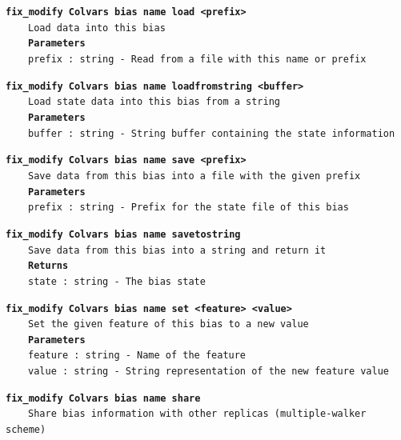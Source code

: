 \begin{mdexampleinput}{}
\texttt{\textbf{fix\_modify Colvars bias name load <prefix>}}
\\
\-~~~~\texttt{Load data into this bias}
\\
\-~~~~\texttt{\textbf{Parameters}}
\\
\-~~~~\texttt{prefix : string - Read from a file with this name or prefix}
\end{mdexampleinput}
\begin{mdexampleinput}{}
\texttt{\textbf{fix\_modify Colvars bias name loadfromstring <buffer>}}
\\
\-~~~~\texttt{Load state data into this bias from a string}
\\
\-~~~~\texttt{\textbf{Parameters}}
\\
\-~~~~\texttt{buffer : string - String buffer containing the state information}
\end{mdexampleinput}
\begin{mdexampleinput}{}
\texttt{\textbf{fix\_modify Colvars bias name save <prefix>}}
\\
\-~~~~\texttt{Save data from this bias into a file with the given prefix}
\\
\-~~~~\texttt{\textbf{Parameters}}
\\
\-~~~~\texttt{prefix : string - Prefix for the state file of this bias}
\end{mdexampleinput}
\begin{mdexampleinput}{}
\texttt{\textbf{fix\_modify Colvars bias name savetostring}}
\\
\-~~~~\texttt{Save data from this bias into a string and return it}
\\
\-~~~~\texttt{\textbf{Returns}}
\\
\-~~~~\texttt{state : string - The bias state}
\end{mdexampleinput}
\begin{mdexampleinput}{}
\texttt{\textbf{fix\_modify Colvars bias name set <feature> <value>}}
\\
\-~~~~\texttt{Set the given feature of this bias to a new value}
\\
\-~~~~\texttt{\textbf{Parameters}}
\\
\-~~~~\texttt{feature : string - Name of the feature}
\\
\-~~~~\texttt{value : string - String representation of the new feature value}
\end{mdexampleinput}
\begin{mdexampleinput}{}
\texttt{\textbf{fix\_modify Colvars bias name share}}
\\
\-~~~~\texttt{Share bias information with other replicas (multiple-walker scheme)}
\end{mdexampleinput}
